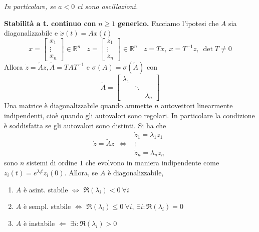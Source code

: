 \documentclass[10pt,a4paper]{book}
\begin{document}
\textit{In particolare, se }$a< 0$\textit{ ci sono oscillazioni.}

\textbf{Stabilità a t. continuo con }$n\geqslant 1$\textbf{ generico.} Facciamo l'ipotesi che $A$ sia diagonalizzabile e $\dot{x}\left(t\right) =Ax\left(t\right)$
\begin{equation*}
	x=\begin{bmatrix}
	x_1\\
	\vdots \\
	x_n
	\end{bmatrix} \in \mathbb{R}^n \ \ \ \ z=\begin{bmatrix}
	z_1\\
	\vdots \\
	z_n
	\end{bmatrix} \in \mathbb{R}^n \ \ \ \ z=Tx,\ x=T^{-1} z,\ \det T\neq 0
\end{equation*}
Allora $\dot{z} =\tilde{A} z,\tilde{A} =TAT^{-1}$ e $\sigma \left(A\right) =\sigma \left(\tilde{A}\right)$ con
\begin{equation*}
	\tilde{A} =\begin{bmatrix}
	\lambda _1 &  & \\
	& \ddots  & \\
	&  & \lambda _n
	\end{bmatrix}
\end{equation*}
Una matrice è diagonalizzabile quando ammette $n$ autovettori linearmente indipendenti, cioè quando gli autovalori sono regolari. In particolare la condizione è soddisfatta se gli autovalori sono distinti. Si ha che
\begin{equation*}
	\dot{z} =\tilde{A} z\ \ \Leftrightarrow \ \ \begin{array}{ c }
	\dot{z}_1 =\lambda _1 z_1\\
	\vdots \\
	\dot{z}_n =\lambda _n z_n
	\end{array}
\end{equation*}
sono $n$ sistemi di ordine $1$ che evolvono in maniera indipendente come $z_i\left(t\right) =e^{\lambda _i t} z_i\left(0\right)$. Allora, se $A$ è diagonalizzabile,
\begin{enumerate}
	\item $A$ è asint. stabile $\Leftrightarrow $ $\Re\left(\lambda _i\right) < 0\ \forall i$
	\item $A$ è sempl. stabile $\Leftrightarrow $ $\Re\left(\lambda _i\right) \leqslant 0\ \forall i,\ \exists i:\Re\left(\lambda _i\right) =0$
	\item $A$ è instabile $\Leftarrow $ $\exists i:\Re\left(\lambda _i\right)  >0$
\end{enumerate}
\end{document}
